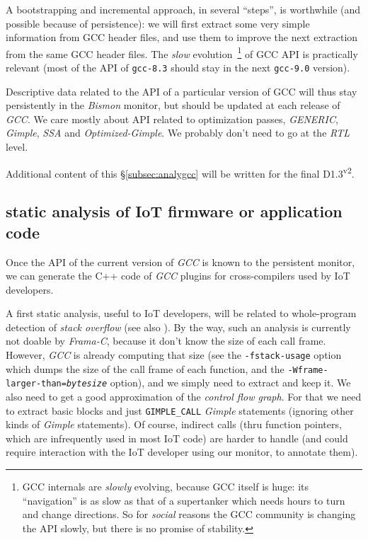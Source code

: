 A bootstrapping and incremental approach, in several ``steps'', is
worthwhile (and possible because of persistence): we will first
extract some very simple information from GCC header files, and use
them to improve the next extraction from the same GCC header
files. The \emph{slow} evolution~\footnote{GCC internals are
  \emph{slowly} evolving, because GCC itself is huge: its
  ``navigation'' is as slow as that of a supertanker which needs hours
  to turn and change directions. So for \emph{social} reasons the GCC
  community is changing the API slowly, but there is no promise of
  stability.}  of GCC API is practically relevant (most of the API of
\texttt{gcc-8.3} should stay in the next \texttt{gcc-9.0} version).

Descriptive data related to the API of a particular version of GCC
will thus stay persistently in the \emph{Bismon} monitor, but should
be updated at each release of \emph{GCC}. We care mostly about API
related to optimization passes, \emph{GENERIC}, \emph{Gimple},
\emph{SSA} and \emph{Optimized-Gimple}. We probably don't need to go
at the \emph{RTL} level.

Additional content of this \S\ref{subsec:analygcc} will be written for the final D1.3\textsuperscript{v2}.

\subsection{static analysis of IoT firmware or application code}
\label{subsec:analysiot}

Once the API of the current version of \emph{GCC} is known to the
persistent monitor, we can generate the C++ code of \emph{GCC} plugins
for cross-compilers used by IoT developers.

A first static analysis, useful to IoT developers, will be related to
whole-program detection of \emph{stack overflow}  (see also \cite{Payer:2018:MSV}). By the way, such an
analysis is currently not doable by \emph{Frama-C}, because it don't
know the size of each call frame. However, \emph{GCC} is already
computing that size (see the \texttt{-fstack-usage} option which dumps
the size of the call frame of each function, and the
\texttt{-Wframe-larger-than=\emph{bytesize}} option), and we simply
need to extract and keep it. We also need to get a good approximation
of the \emph{control flow graph}. For that
we need to extract basic blocks and just \texttt{GIMPLE\_CALL}
\emph{Gimple} statements (ignoring other kinds of \emph{Gimple}
statements). Of course, indirect calls (thru function pointers, which
are infrequently used in most IoT code) are harder to handle (and
could require interaction with the IoT developer using our monitor, to
annotate them).

